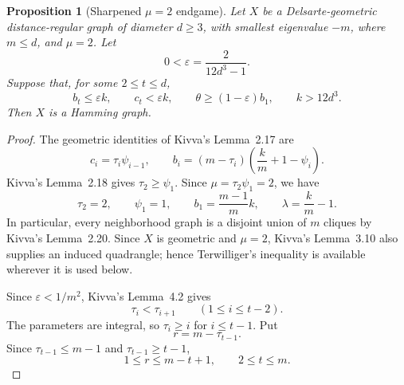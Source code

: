 \documentclass[11pt]{amsart}
\newtheorem{proposition}[theorem]{Proposition}
\theoremstyle{definition}
\newcommand{\eps}{\varepsilon}
\begin{document}
\begin{proposition}[Sharpened $\mu=2$ endgame]\label{prop:mu2}
Let $X$ be a Delsarte-geometric distance-regular graph of diameter $d\ge3$, with smallest eigenvalue $-m$, where $m\le d$, and $\mu=2$.  Let
\[
  0<\eps=\frac{2}{12d^3-1}.
\]
Suppose that, for some $2\le t\le d$,
\begin{equation}\label{eq:mu2hyp}
  b_t\le\eps k,
  \qquad c_t<\eps k,
  \qquad \theta\ge(1-\eps)b_1,
  \qquad k>12d^3.
\end{equation}
Then $X$ is a Hamming graph.
\end{proposition}

\begin{proof}
The geometric identities of Kivva's Lemma~2.17 are
\begin{equation}\label{eq:geometricidentities}
  c_i=\tau_i\psi_{i-1},
  \qquad
  b_i=(m-\tau_i)\left(\frac{k}{m}+1-\psi_i\right).
\end{equation}
Kivva's Lemma~2.18 gives $\tau_2\ge\psi_1$.  Since $\mu=\tau_2\psi_1=2$, we have
\begin{equation}\label{eq:mu2parameters}
  \tau_2=2,
  \qquad \psi_1=1,
  \qquad b_1=\frac{m-1}{m}k,
  \qquad \lambda=\frac{k}{m}-1.
\end{equation}
In particular, every neighborhood graph is a disjoint union of $m$ cliques by Kivva's Lemma~2.20.  Since $X$ is geometric and $\mu=2$, Kivva's Lemma~3.10 also supplies an induced quadrangle; hence Terwilliger's inequality is available wherever it is used below.

Since $\eps<1/m^2$, Kivva's Lemma~4.2 gives
\begin{equation}\label{eq:taugrowth}
  \tau_i<\tau_{i+1}\qquad(1\le i\le t-2).
\end{equation}
The parameters are integral, so $\tau_i\ge i$ for $i\le t-1$.  Put
\begin{equation}\label{eq:rdef}
  r=m-\tau_{t-1}.
\end{equation}
Since $\tau_{t-1}\le m-1$ and $\tau_{t-1}\ge t-1$,
\begin{equation}\label{eq:rrange}
  1\le r\le m-t+1,
  \qquad 2\le t\le m.
\end{equation}


\end{proof}
\end{document}
